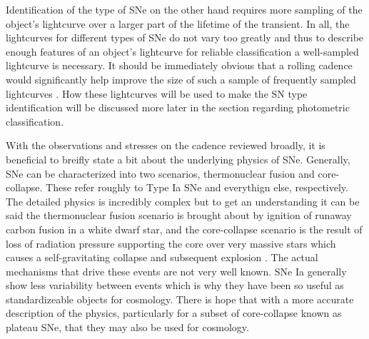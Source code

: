 \documentclass[12pt]{article}
\begin{document}
Identification of the type of SNe on the other hand requires more sampling of the object's lightcurve over a larger part of the lifetime of the transient. In all, the lightcurves for different types of SNe do not vary too greatly and thus to describe enough features of an object's lightcurve for reliable classification a well-sampled lightcurve is necessary. It should be immediately obvious that a rolling cadence would significantly help improve the size of such a sample of frequently sampled lightcurves \citep{LSSTScienceCollaboration2017}. How these lightcurves will be used to make the SN type identification will be discussed more later in the section regarding photometric classification. \par
With the observations and stresses on the cadence reviewed broadly, it is beneficial to breifly state a bit about the underlying physics of SNe. Generally, SNe can be characterized into two scenarios, thermonuclear fusion and core-collapse. These refer roughly to Type Ia SNe and everythign else, respectively. The detailed physics is incredibly complex but to get an understanding it can be said the thermonuclear fusion scenario is brought about by ignition of runaway carbon fusion in a white dwarf star, and the core-collapse scenario is the result of loss of radiation pressure supporting the core over very massive stars which causes a self-gravitating collapse and subsequent explosion \citep{Heger2002,Mazzali2007}. The actual mechanisms that drive these events are not very well known. SNe Ia generally show less variability between events which is why they have been so useful as standardizeable objects for cosmology. There is hope that with a more accurate description of the physics, particularly for a subset of core-collapse known as plateau SNe, that they may also be used for cosmology. \par
\end{document}
